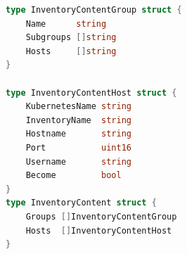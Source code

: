 \begin{lstlisting}[language=go]
type InventoryContentGroup struct {
	Name      string
	Subgroups []string
	Hosts     []string
}

type InventoryContentHost struct {
	KubernetesName string
	InventoryName  string
	Hostname       string
	Port           uint16
	Username       string
	Become         bool
}
type InventoryContent struct {
	Groups []InventoryContentGroup
	Hosts  []InventoryContentHost
}
\end{lstlisting}
